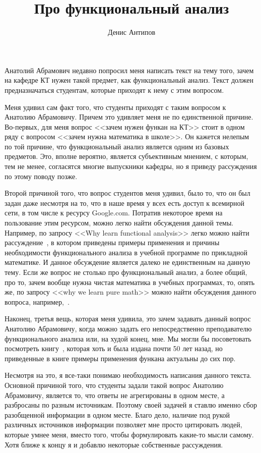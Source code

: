 \documentclass[russian]{article}
\title{Про функциональный анализ}
\author{Денис Антипов}
\begin{document}
\maketitle

Анатолий Абрамович недавно попросил меня написать текст на тему того, зачем на кафедре КТ нужен такой предмет, как функциональный анализ. Текст должен предназначаться студентам, которые приходят к нему с этим вопросом.

Меня удивил сам факт того, что студенты приходят с таким вопросом к Анатолию Абрамовичу. Причем это удивляет меня не по единственной причине. Во-первых, для меня вопрос <<зачем нужен функан на КТ>> стоит в одном ряду с вопросом <<зачем нужна математика в школе>>. Он кажется нелепым по той причине, что функциональный анализ является одним из базовых предметов. Это, вполне вероятно, является субъективным мнением, с которым, тем не менее, согласятся многие выпускники кафедры, но я приведу рассуждения по этому поводу позже.

Второй причиной того, что вопрос студентов меня удивил, было то, что он был задан даже несмотря на то, что в наше время у всех есть доступ к всемирной сети, в том числе к ресурсу Google.com. Потратив некоторое время на пользование этим ресурсом, можно легко найти обсуждения данной темы. Например, по запросу <<Why learn functional analysis>> легко можно найти рассуждение~\cite{why-funcan}, в котором приведены примеры применения и причины необходимости функционального анализа в учебной программе по прикладной математике. И данное обсуждение является далеко не единственным на данную тему. Если же вопрос не столько про функциональный анализ, а более общий, про то, зачем вообще нужна чистая математика в учебных программах, то, опять же, по запросу <<why we learn pure math>> можно найти обсуждения данного вопроса, например,~\cite{why-pure-math}.

Наконец, третья вещь, которая меня удивила, это зачем задавать данный вопрос Анатолию Абрамовичу, когда можно задать его непосредственно преподавателю функционального анализа или, на худой конец, мне. Мы могли бы посоветовать посмотреть книгу~\cite{kollats}, которая хоть и была издана почти 50 лет назад, но приведенные в книге примеры применения функана актуальны до сих пор.

Несмотря на это, я все-таки понимаю необходимость написания данного текста. Основной причиной того, что студенты задали такой вопрос Анатолию Абрамовичу, является то, что ответы не агрегированы в одном месте, а разбросаны по разным источникам. Поэтому своей задачей я ставлю именно сбор разобщенной информации в одном месте. Благо дело, наличие под рукой различных источников информации позволяет мне просто цитировать людей, которые умнее меня, вместо того, чтобы формулировать какие-то мысли самому. Хотя ближе к концу я и добавлю некоторые собственные рассуждения.
\end{document}
